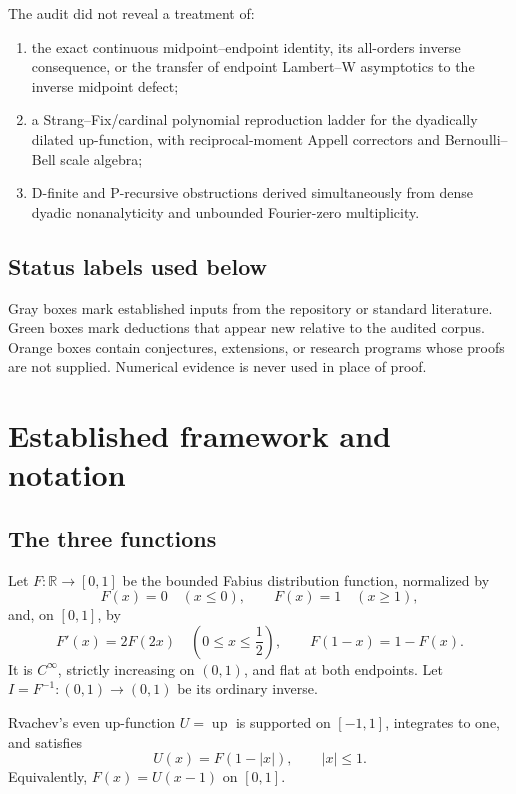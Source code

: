 \documentclass[11pt,oneside]{article}
\theoremstyle{definition}
\theoremstyle{remark}
\newcommand{\R}{\mathbb R}
\newcommand{\Up}{\operatorname{up}}
\begin{document}
\begin{mainpointbox}[title=Three principal corpus gaps]
The audit did not reveal a treatment of:
\begin{enumerate}
\item the exact continuous midpoint--endpoint identity, its all-orders inverse consequence, or the transfer of endpoint Lambert--W asymptotics to the inverse midpoint defect;
\item a Strang--Fix/cardinal polynomial reproduction ladder for the dyadically dilated up-function, with reciprocal-moment Appell correctors and Bernoulli--Bell scale algebra;
\item D-finite and P-recursive obstructions derived simultaneously from dense dyadic nonanalyticity and unbounded Fourier-zero multiplicity.
\end{enumerate}
\end{mainpointbox}

\subsection{Status labels used below}
Gray boxes mark established inputs from the repository or standard literature.  Green boxes mark deductions that appear new relative to the audited corpus.  Orange boxes contain conjectures, extensions, or research programs whose proofs are not supplied.  Numerical evidence is never used in place of proof.

\section{Established framework and notation}
\label{sec:framework}

\subsection{The three functions}
Let $F:\R\to[0,1]$ be the bounded Fabius distribution function, normalized by
\[
 F(x)=0\quad(x\le0),\qquad F(x)=1\quad(x\ge1),
\]
and, on $[0,1]$, by
\begin{equation}
 F'(x)=2F(2x)\quad\left(0\le x\le\frac12\right),
 \qquad F(1-x)=1-F(x).
 \label{eq:fabius-basic}
\end{equation}
It is $C^\infty$, strictly increasing on $(0,1)$, and flat at both endpoints.  Let $I=F^{-1}:(0,1)\to(0,1)$ be its ordinary inverse.

Rvachev's even up-function $U=\Up$ is supported on $[-1,1]$, integrates to one, and satisfies~\cite{ariasUp,ariasArithmetic}
\begin{equation}
 U(x)=F(1-|x|),\qquad |x|\le1.
 \label{eq:up-fabius}
\end{equation}
Equivalently, $F(x)=U(x-1)$ on $[0,1]$.
\end{document}

